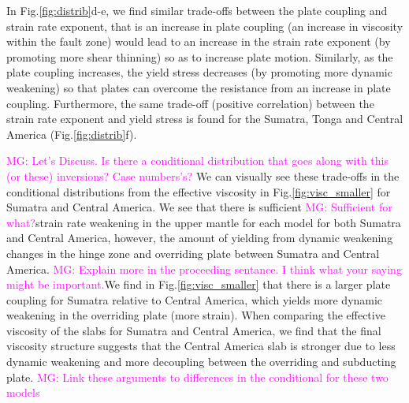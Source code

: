 \documentclass[12pt]{article}
\newcommand{\mgnote}[1]{\textcolor{magenta}{MG: #1}}
\begin{document}
{In Fig.\ref{fig:distrib}d-e, we find similar trade-offs between the plate coupling and strain rate exponent, that is an increase in plate coupling (an increase in viscosity within the fault zone) would lead to an increase in the strain rate exponent (by promoting more shear thinning) so as to increase plate motion. Similarly, as the plate coupling increases, the yield stress decreases (by promoting more dynamic weakening) so that plates can overcome the resistance from an increase in plate coupling. Furthermore, the same trade-off (positive correlation) between the strain rate exponent and yield stress is found for the Sumatra, Tonga and Central America (Fig.\ref{fig:distrib}f). 

\mgnote{Let's Discuss. Is there a conditional distribution that goes along with this (or these) inversions? Case numbers's?}
We can visually see these trade-offs in the conditional distributions from the effective viscosity in Fig.\ref{fig:visc_smaller} for Sumatra and Central America. We see that there is sufficient \mgnote{Sufficient for what?}strain rate weakening in the upper mantle for each model for both Sumatra and Central America, however, the amount of yielding from dynamic weakening changes in the hinge zone and overriding plate between Sumatra and Central America. \mgnote{Explain more in the proceeding sentance. I think what your saying might be important.}We find in Fig.\ref{fig:visc_smaller} that there is a larger plate coupling for Sumatra relative to Central America, which  yields more dynamic weakening in the overriding plate (more strain). When comparing the effective viscosity of the slabs for Sumatra and Central America, we find that the final viscosity structure suggests that the Central America slab is stronger due to less dynamic weakening and more decoupling between the overriding and subducting plate. \mgnote{Link these arguments to differences in the conditional for these two models}




\begin{figure}[H]
\centering
\hspace{-0.85cm}
 

\end{figure}}
\end{document}
